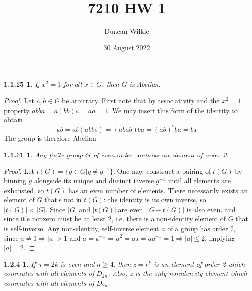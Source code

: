 \documentclass{article}
\title{7210 HW 1}
\author{Duncan Wilkie}
\date{30 August 2022}
\newtheorem*{1.1.25}{1.1.25}
\newtheorem*{1.1.31}{1.1.31}
\newtheorem*{1.2.4}{1.2.4}
\begin{document}
\maketitle

\begin{1.1.25}
If $x^{2}=1$ for all $x\in G$, then $G$ is Abelian.
\end{1.1.25}

\begin{proof}
  Let $a,b\in G$ be arbitrary.
  First note that by associativity and the $x^{2}=1$ property $abba = a(bb)a = aa = 1$.
  We may insert this form of the identity to obtain
  \[
    ab = ab(abba) = (abab)ba = (ab)^{2}ba = ba
  \]
  The group is therefore Abelian.
\end{proof}

\begin{1.1.31}
  Any finite group $G$ of even order contains an element of order 2.
\end{1.1.31}

\begin{proof}
  Let $t(G)=\{g\in G | g\neq g^{-1}\}$.
  One may construct a pairing of $t(G)$ by binning $g$ alongside its unique and distinct inverse $g^{-1}$ until all elements are exhausted,
  so $t(G)$ has an even number of elements.
  There necessarily exists an element of $G$ that's not in $t(G)$: the identity is its own inverse, so $|t(G)| < |G|$.
  Since $|G|$ and $|t(G)|$ are even, $|G-t(G)|$ is also even, and since it's nonzero must be at least 2,
  i.e. there is a non-identity element of $G$ that is self-inverse.
  Any non-identity, self-inverse element $a$ of a group has order 2, since $a\neq 1\Rightarrow |a|>1$
  and $a=a^{-1}\Rightarrow a^{2}=aa=aa^{-1}=1 \Rightarrow |a|\leq 2$, implying $|a| = 2$.
\end{proof}

\begin{1.2.4}
  If $n=2k$ is even and $n\geq 4$, then $z=r^{k}$ is an element of order 2 which commutes with all elements of $D_{2n}$.
  Also, $z$ is the only nonidentity element which commutes with all elements of $D_{2n}$.
\end{1.2.4}
\end{document}
